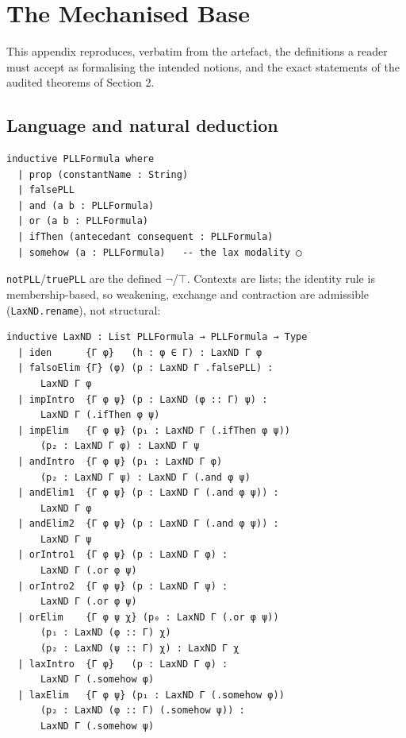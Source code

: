 
\section{The Mechanised Base}\label{app:base}

This appendix reproduces, verbatim from the artefact, the definitions a
reader must accept as formalising the intended notions, and the exact
statements of the audited theorems of Section 2.

\subsection{Language and natural deduction}

\begin{lstlisting}
inductive PLLFormula where
  | prop (constantName : String)
  | falsePLL
  | and (a b : PLLFormula)
  | or (a b : PLLFormula)
  | ifThen (antecedant consequent : PLLFormula)
  | somehow (a : PLLFormula)   -- the lax modality ◯
\end{lstlisting}

\noindent \texttt{notPLL}/\texttt{truePLL} are the defined
\ensuremath{\lnot}/\ensuremath{\top}. Contexts are lists; the identity rule is
membership-based, so weakening, exchange and contraction are admissible
(\texttt{LaxND.rename}), not structural:

\begin{lstlisting}
inductive LaxND : List PLLFormula → PLLFormula → Type
  | iden      {Γ φ}   (h : φ ∈ Γ) : LaxND Γ φ
  | falsoElim {Γ} (φ) (p : LaxND Γ .falsePLL) :
      LaxND Γ φ
  | impIntro  {Γ φ ψ} (p : LaxND (φ :: Γ) ψ) :
      LaxND Γ (.ifThen φ ψ)
  | impElim   {Γ φ ψ} (p₁ : LaxND Γ (.ifThen φ ψ))
      (p₂ : LaxND Γ φ) : LaxND Γ ψ
  | andIntro  {Γ φ ψ} (p₁ : LaxND Γ φ)
      (p₂ : LaxND Γ ψ) : LaxND Γ (.and φ ψ)
  | andElim1  {Γ φ ψ} (p : LaxND Γ (.and φ ψ)) :
      LaxND Γ φ
  | andElim2  {Γ φ ψ} (p : LaxND Γ (.and φ ψ)) :
      LaxND Γ ψ
  | orIntro1  {Γ φ ψ} (p : LaxND Γ φ) :
      LaxND Γ (.or φ ψ)
  | orIntro2  {Γ φ ψ} (p : LaxND Γ ψ) :
      LaxND Γ (.or φ ψ)
  | orElim    {Γ φ ψ χ} (p₀ : LaxND Γ (.or φ ψ))
      (p₁ : LaxND (φ :: Γ) χ)
      (p₂ : LaxND (ψ :: Γ) χ) : LaxND Γ χ
  | laxIntro  {Γ φ}   (p : LaxND Γ φ) :
      LaxND Γ (.somehow φ)
  | laxElim   {Γ φ ψ} (p₁ : LaxND Γ (.somehow φ))
      (p₂ : LaxND (φ :: Γ) (.somehow ψ)) :
      LaxND Γ (.somehow ψ)
\end{lstlisting}

